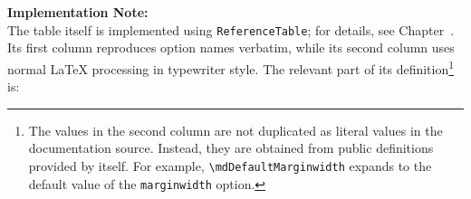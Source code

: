 \documentclass[
11pt,
a4paper,
oneside
]{scrbook}
\begin{document}
%		
%		
%		
%		
%		

 

\begin{FullArea}
	\begin{note}
		\textbf{Implementation Note:}\\
		The table itself is implemented using \texttt{ReferenceTable};
		for details, see Chapter~.
		Its first column reproduces option names verbatim, while its second
		column uses normal \LaTeX{} processing in typewriter style.
		The relevant part of its definition\footnote{The
			values in the second column are not duplicated as literal values in
			the documentation source. Instead, they are obtained from public
			definitions provided by \MDWordmark itself. For example,
			\texttt{\textbackslash{}mdDefaultMarginwidth} expands to the default value
			of the \texttt{marginwidth} option.}
		is:




	\end{note}
\end{FullArea}
\end{document}
